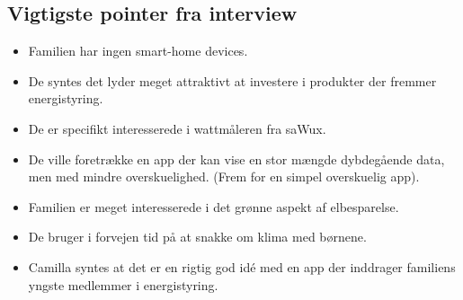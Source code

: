 \subsection{Vigtigste pointer fra interview}
\begin{itemize}
    \item Familien har ingen smart-home devices.
    \item De syntes det lyder meget attraktivt at investere i produkter der fremmer energistyring.
    \item De er specifikt interesserede i wattmåleren fra saWux.
    \item De ville foretrække en app der kan vise en stor mængde dybdegående data, men med mindre overskuelighed. (Frem for en simpel overskuelig app). 
    \item Familien er meget interesserede i det grønne aspekt af elbesparelse.
    \item De bruger i forvejen tid på at snakke om klima med børnene.
    \item Camilla syntes at det er en rigtig god idé med en app der inddrager familiens yngste medlemmer i energistyring.
\end{itemize}